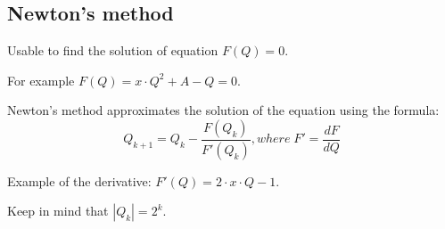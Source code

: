 \subsection{Newton's method}

Usable to find the solution of equation $F(Q) = 0$.

For example $F(Q) = x \cdot Q^2 + A - Q = 0$.

Newton's method approximates the solution of the equation using the formula: 
$$Q_{k + 1} = Q_{k} - \frac{F(Q_k)}{F'(Q_k)}, where\; F' = \frac{dF}{dQ}$$

Example of the derivative: $F'(Q) = 2 \cdot x \cdot Q - 1$.

Keep in mind that $|Q_{k}| = 2^k$.

